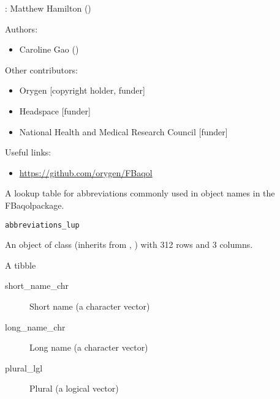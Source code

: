 \documentclass[a4paper]{book}
\begin{document}
%
\begin{Author}\relax
{}: Matthew Hamilton  ()

Authors:
\begin{itemize}

\item{} Caroline Gao  ()

\end{itemize}


Other contributors:
\begin{itemize}

\item{} Orygen [copyright holder, funder]
\item{} Headspace [funder]
\item{} National Health and Medical Research Council [funder]

\end{itemize}


\end{Author}
%
\begin{SeeAlso}\relax
Useful links:
\begin{itemize}

\item{} \url{https://github.com/orygen/FBaqol}

\end{itemize}


\end{SeeAlso}
%
\begin{Description}\relax
A lookup table for abbreviations commonly used in object names in the FBaqolpackage.
\end{Description}
%
\begin{Usage}
\begin{verbatim}
abbreviations_lup
\end{verbatim}
\end{Usage}
%
\begin{Format}
An object of class  (inherits from , ) with 312 rows and 3 columns.
\end{Format}
%
\begin{Details}\relax
A tibble

\begin{description}

\item[short\_name\_chr] Short name (a character vector)
\item[long\_name\_chr] Long name (a character vector)
\item[plural\_lgl] Plural (a logical vector)

\end{description}

\end{Details}
\end{document}
